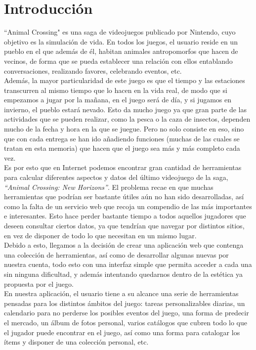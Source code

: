 \chapter{Introducción}\label{introduccion}

``Animal Crossing" {es} una saga de videojuegos publicado por Nintendo, cuyo objetivo es la simulación de vida. En todos los juegos, el usuario reside en un pueblo en el que además de él, habitan animales antropomorfos que hacen de vecinos, de forma que se pueda establecer una relación con ellos entablando conversaciones, realizando favores, celebrando eventos, etc.\\

Además, la mayor particularidad de este juego es que el tiempo y las estaciones transcurren al mismo tiempo que lo hacen en la vida real, de modo que si empezamos a jugar por la mañana, en el juego será de día, y si jugamos en invierno, el pueblo estará nevado. Esto da mucho juego ya que gran parte de las actividades que se pueden realizar, como la pesca o la caza de insectos, dependen mucho de la fecha y hora en la que se juegue. Pero no solo consiste en eso, sino que con cada entrega se han ido añadiendo funciones (muchas de las cuales se tratan en esta memoria) que hacen que el juego sea más y más completo cada vez.\\

Es por esto que en Internet podemos encontrar gran cantidad de herramientas para calcular diferentes aspectos y datos del último videojuego de la saga, \textit{``Animal Crossing: New Horizons”}. El problema recae en que muchas herramientas que podrían ser bastante útiles aún no han sido desarrolladas, así como la falta de un servicio web que recoja un compendio de las más importantes e interesantes. Esto hace perder bastante tiempo a todos aquellos jugadores que deseen consultar ciertos datos, ya que tendrían que navegar por distintos sitios, en vez de disponer de todo lo que necesitan en un mismo lugar.\\

Debido a esto, llegamos a la decisión de crear una aplicación web que contenga una colección de herramientas, así como de desarrollar algunas nuevas por nuestra cuenta, todo esto con una interfaz simple que permita acceder a cada una sin ninguna dificultad, y además intentando quedarnos dentro de la estética ya propuesta por el juego.\\

En nuestra aplicación, el usuario tiene a su alcance una serie de herramientas pensadas para los distintos ámbitos del juego: tareas personalizables diarias, un calendario para no perderse los posibles eventos del juego, una forma de predecir el mercado, un álbum de fotos personal, varios catálogos que cubren todo lo que el jugador puede encontrar en el juego, así como una forma para catalogar los ítems y disponer de una colección personal, etc.\\

